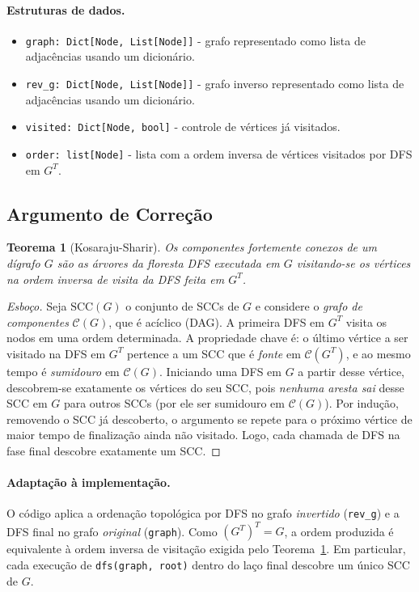 \documentclass[11pt,a4paper]{article}
\newtheorem{theorem}{Teorema}
\begin{document}
\paragraph{Estruturas de dados.}
\begin{itemize}
    \item \texttt{graph: Dict[Node, List[Node]]} - grafo representado como lista de adjacências
    usando um dicionário.
    \item \texttt{rev\_g: Dict[Node, List[Node]]} - grafo inverso representado como lista de adjacências
    usando um dicionário.
    \item \texttt{visited: Dict[Node, bool]} - controle de vértices
    já visitados.
    \item \texttt{order: list[Node]} - lista com a ordem inversa de vértices visitados por DFS
    em $G^T$.
\end{itemize}

\subsection{Argumento de Correção}

\begin{theorem}[Kosaraju-Sharir]
\label{teo:kosaraju}
Os componentes fortemente conexos de um dígrafo $G$ são as árvores da floresta DFS executada em $G$ visitando-se os vértices
na ordem inversa de visita da DFS feita em $G^T$.
\end{theorem}

\begin{proof}[Esboço]
Seja $\mathrm{SCC}(G)$ o conjunto de SCCs de $G$ e considere o
\emph{grafo de componentes} $\mathcal{C}(G)$, que é acíclico (DAG). A primeira DFS em
$G^T$ visita os nodos em uma ordem determinada. A propriedade chave é: o último vértice
a ser visitado na DFS em $G^T$ pertence a um
SCC que é \emph{fonte} em $\mathcal{C}(G^T)$, e ao mesmo tempo é
\emph{sumidouro} em $\mathcal{C}(G)$. Iniciando uma DFS em $G$ a
partir desse vértice, descobrem-se exatamente os vértices do seu
SCC, pois \emph{nenhuma aresta sai} desse SCC em $G$ para outros
SCCs (por ele ser sumidouro em $\mathcal{C}(G)$). Por indução,
removendo o SCC já descoberto, o argumento se repete para o próximo
vértice de maior tempo de finalização ainda não visitado. Logo, cada
chamada de DFS na fase final descobre exatamente um SCC.
\end{proof}

\paragraph{Adaptação à implementação.} O código aplica a
ordenação topológica por DFS no grafo \emph{invertido}
(\texttt{rev\_g}) e a DFS final no grafo \emph{original}
(\texttt{graph}). Como $(G^T)^T = G$, a ordem produzida é
equivalente à ordem inversa de visitação exigida
pelo Teorema~\ref{teo:kosaraju}. Em particular, cada execução de
\texttt{dfs(graph, root)} dentro do laço final descobre um único
SCC de $G$.
\end{document}
